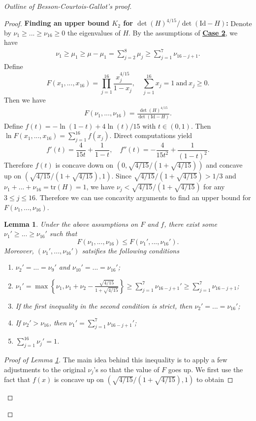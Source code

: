 \documentclass{article}
\newcommand{\id}{\mathrm{Id}}
\newcommand{\tr}{\mathrm{tr}}
\newtheorem{lem}[thm]{Lemma}
\theoremstyle{definition}
\begin{document}
\begin{proof}[Outline of Besson-Courtois-Gallot's proof]
\begin{proof}
\textbf{Finding an upper bound $K_2$ for $\det(H)^{4/15}/\det(\id-H)$:} Denote by $\nu_1\geq...\geq\nu_{16}\geq 0$ the eigenvalues of $H$. By the assumptions of \textbf{\hyperlink{case2}{Case 2}}, we have 
\begin{align}\label{7_ineq}
\nu_1\geq\mu_1\geq\mu-\mu_1=\sum_{j=2}^8\mu_j\geq\sum_{j=1}^7\nu_{16-j+1}.\end{align}
Define
$$F(x_1,...,x_{16})=\prod_{j=1}^{16}\frac{x_j^{4/15}}{1-x_j},\quad \sum_{j=1}^{16}x_j=1\mathrm{~and~}x_j\geq 0.$$
Then we have
\begin{align}\label{F(eigen)}F(\nu_1,...,\nu_{16})=\frac{\det(H)^{4/15}}{\det(\id-H)}.\end{align}
Define $f(t)=-\ln(1-t)+4\ln(t)/15$ with $t\in(0,1)$. Then $\ln F(x_1,...,x_{16})=\sum_{j=1}^{16}f(x_j)$. Direct computations yield
$$f'(t)=\frac{4}{15t}+\frac{1}{1-t},\quad f''(t)=-\frac{4}{15t^2}+\frac{1}{(1-t)^2}.$$
Therefore $f(t)$ is concave down on $\left(0,\sqrt{4/15}/\left(1+\sqrt{4/15}\right)\right)$ and concave up on $(\sqrt{4/15}/(1+\sqrt{4/15}),1)$. Since $\sqrt{4/15}/\left(1+\sqrt{4/15}\right)>1/3$ and $\nu_1+...+\nu_{16}=\tr(H)=1$, we have $\nu_j<\sqrt{4/15}/\left(1+\sqrt{4/15}\right)$ for any $3\leq j\leq 16$. Therefore we can use concavity arguments to find an upper bound for $F(\nu_1,...,\nu_{16})$.
\begin{lem}\label{F_Gmax}
Under the above assumptions on $F$ and $f$, there exist some $\nu_1'\geq...\geq\nu_{16}'$ such that
$$F(\nu_1,...,\nu_{16})\leq F(\nu_1',...,\nu_{16}').$$
Moreover, $(\nu_1',...,\nu_{16}')$ satsifies the following conditions 
\begin{enumerate}
\item[(1).] $\nu_2'=...=\nu_9'$ and $\nu_{10}'=...=\nu_{16}'$;
\item[(2).] $\nu_1'=\max\left\{\nu_1,\nu_1+\nu_2-\frac{\sqrt{4/15}}{1+\sqrt{4/15}}\right\}\geq\sum_{j=1}^7\nu_{16-j+1}'\geq\sum_{j=1}^7\nu_{16-j+1}$;
\item[(3).] If the first inequality in the second condition is strict, then $\nu_2'=...=\nu_{16}'$;
\item[(4).] If $\nu_2'>\nu_{16}$, then $\nu_1'=\sum_{j=1}^7\nu_{16-j+1}'$;
\item[(5).] $\sum_{j=1}^{16}\nu_j'=1$.
\end{enumerate}
\end{lem}
\begin{proof}[Proof of Lemma \ref{F_Gmax}]
The main idea behind this inequality is to apply a few adjustments to the original $\nu_j$'s so that the value of $F$ goes up. We first use the fact that $f(x)$ is concave up on $(\sqrt{4/15}/(1+\sqrt{4/15}),1)$ to obtain

\end{proof}
\end{proof}
\end{proof}
\end{document}
